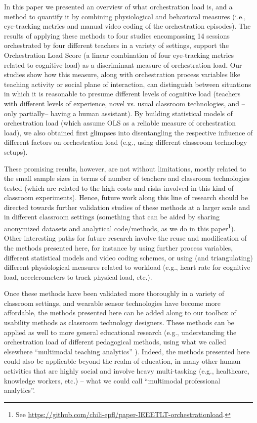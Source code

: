 \documentclass[10pt,journal,compsoc]{IEEEtran}
\begin{document}
In this paper we presented an overview of what orchestration load is, and a method to quantify it by combining physiological and behavioral measures (i.e., eye-tracking metrics and manual video coding of the orchestration episodes). The results of applying these methods to four studies encompassing 14 sessions orchestrated by four different teachers in a variety of settings, support the Orchestration Load Score (a linear combination of four eye-tracking metrics related to cognitive load) as a discriminant measure of orchestration load. Our studies show how this measure, along with orchestration process variables like teaching activity or social plane of interaction, can distinguish between situations in which it is reasonable to presume different levels of cognitive load (teachers with different levels of experience, novel vs. usual classroom technologies, and --only partially-- having a human assistant). By building statistical models of orchestration load (which assume OLS as a reliable measure of orchestration load), we also obtained first glimpses into disentangling the respective influence of different factors on orchestration load (e.g., using different classroom technology setups).

These promising results, however, are not without limitations, mostly related to the small sample sizes in terms of number of teachers and classroom technologies tested (which are related to the high costs and risks involved in this kind of classroom experiments). Hence, future work along this line of research should be directed towards further validation studies of these methods at a larger scale and in different classroom settings (something that can be aided by sharing anonymized datasets and analytical code/methods, as we do in this paper\footnote{See \href{https://github.com/chili-epfl/paper-IEEETLT-orchestrationload}{https://github.com/chili-epfl/paper-IEEETLT-orchestrationload}.}). Other interesting paths for future research involve the reuse and modification of the methods presented here, for instance by using further process variables, different statistical models and video coding schemes, or using (and triangulating) different physiological measures related to workload (e.g., heart rate for cognitive load, accelerometers to track physical load, etc.).

Once these methods have been validated more thoroughly in a variety of classroom settings, and wearable sensor technologies have become more affordable, the methods presented here can be added along to our toolbox of usability methods as classroom technology designers. These methods can be applied as well to more general educational research (e.g., understanding the orchestration load of different pedagogical methods, using what we called elsewhere ``multimodal teaching analytics'' \cite{prieto2016teaching}). Indeed, the methods presented here could also be applicable beyond the realm of education, in many other human activities that are highly social and involve heavy multi-tasking (e.g., healthcare, knowledge workers, etc.) -- what we could call ``multimodal professional analytics''.
\end{document}
